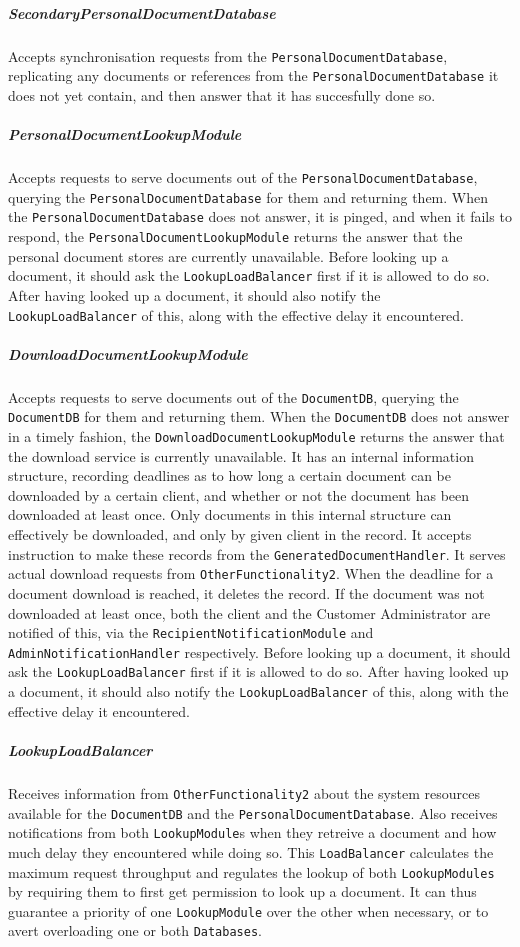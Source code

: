 \documentclass[a4paper,10pt]{article}
\begin{document}
\subparagraph{SecondaryPersonalDocumentDatabase}
Accepts synchronisation requests from the \texttt{PersonalDocumentDatabase}, replicating any documents or references from the \texttt{PersonalDocumentDatabase} it does not yet contain, and then answer that it has succesfully done so.

\subparagraph{PersonalDocumentLookupModule}
Accepts requests to serve documents out of the \texttt{PersonalDocumentDatabase}, querying the \texttt{PersonalDocumentDatabase} for them and returning them. When the \texttt{PersonalDocumentDatabase} does not answer, it is pinged, and when it fails to respond, the \texttt{PersonalDocumentLookupModule} returns the answer that the personal document stores are currently unavailable. Before looking up a document, it should ask the \texttt{LookupLoadBalancer} first if it is allowed to do so. After having looked up a document, it should also notify the \texttt{LookupLoadBalancer} of this, along with the effective delay it encountered.

\subparagraph{DownloadDocumentLookupModule}
Accepts requests to serve documents out of the \texttt{DocumentDB}, querying the \texttt{DocumentDB} for them and returning them. When the \texttt{DocumentDB} does not answer in a timely fashion, the \texttt{DownloadDocumentLookupModule} returns the answer that the download service is currently unavailable. It has an internal information structure, recording deadlines as to how long a certain document can be downloaded by a certain client, and whether or not the document has been downloaded at least once. Only documents in this internal structure can effectively be downloaded, and only by given client in the record. It accepts instruction to make these records from the \texttt{GeneratedDocumentHandler}. It serves actual download requests from \texttt{OtherFunctionality2}. When the deadline for a document download is reached, it deletes the record. If the document was not downloaded at least once, both the client and the Customer Administrator are notified of this, via the \texttt{RecipientNotificationModule} and \texttt{AdminNotificationHandler} respectively. Before looking up a document, it should ask the \texttt{LookupLoadBalancer} first if it is allowed to do so. After having looked up a document, it should also notify the \texttt{LookupLoadBalancer} of this, along with the effective delay it encountered.

\subparagraph{LookupLoadBalancer}
Receives information from \texttt{OtherFunctionality2} about the system resources available for the \texttt{DocumentDB} and the \texttt{PersonalDocumentDatabase}. Also receives notifications from both \texttt{LookupModule}s when they retreive a document and how much delay they encountered while doing so. This \texttt{LoadBalancer} calculates the maximum request throughput and regulates the lookup of both \texttt{LookupModules} by requiring them to first get permission to look up a document. It can thus guarantee a priority of one \texttt{LookupModule} over the other when necessary, or to avert overloading one or both \texttt{Databases}.
\end{document}
